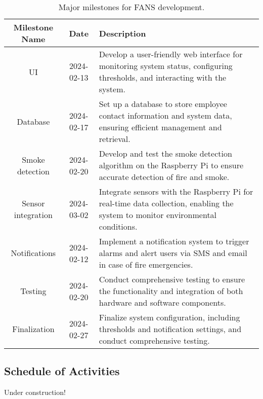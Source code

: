 \begin{table}[H]
    \centering
    \begin{tabular}{| c | c | p{9cm} |}
        \hline
        \textbf{Milestone Name} & \textbf{Date} & \textbf{Description}                                                                            \\
        \hline
        UI                      & 2024-02-13    & Develop a user-friendly web interface for monitoring system status, configuring thresholds, and
        interacting with the system.                                                                                                              \\
        \hline Database         & 2024-02-17    & Set up a database to store employee contact information
        and system data, ensuring efficient management and retrieval.                                                                             \\
        \hline Smoke detection  & 2024-02-20    & Develop and test
        the smoke detection algorithm on the Raspberry Pi to ensure accurate detection of fire and smoke.                                         \\
        \hline
        Sensor integration      & 2024-03-02    & Integrate sensors with the Raspberry Pi for real-time data collection, enabling the
        system to monitor environmental conditions.                                                                                               \\
        \hline
        Notifications           & 2024-02-12    & Implement a notification system to trigger alarms and alert users via SMS and email
        in case of fire emergencies.                                                                                                              \\
        \hline
        Testing                 & 2024-02-20    & Conduct comprehensive testing to ensure the functionality and integration of both
        hardware and software components.                                                                                                         \\
        \hline
        Finalization            & 2024-02-27    & Finalize system configuration, including thresholds and notification settings, and
        conduct comprehensive testing.                                                                                                            \\
        \hline
    \end{tabular}
    \caption{Major milestones for FANS development.}
\end{table}

\subsection{Schedule of Activities}

Under construction!

